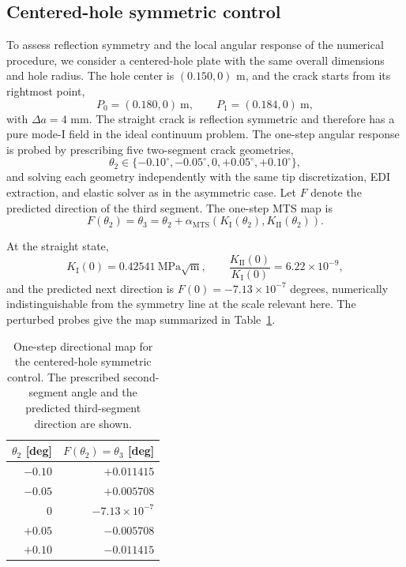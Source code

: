 \documentclass[pdflatex,sn-mathphys-num]{sn-jnl}
\begin{document}
\subsection{Centered-hole symmetric control}
To assess reflection symmetry and the local angular response of the
numerical procedure, we consider a centered-hole plate with the same
overall dimensions and hole radius. The hole center is
$(0.150,0)$ m, and the crack starts from its rightmost point,
\[
 P_0=(0.180,0)\ \mathrm m,
 \qquad
 P_1=(0.184,0)\ \mathrm m,
\]
with $\Delta a=4$ mm. The straight crack is reflection symmetric
and therefore has a pure mode-I field in the ideal continuum problem.
The one-step angular response is probed by prescribing five
two-segment crack geometries,
\[
 \theta_2\in\{-0.10^\circ,-0.05^\circ,0,
                 +0.05^\circ,+0.10^\circ\},
\]
and solving each geometry independently with the same tip
discretization, EDI extraction, and elastic solver as in the
asymmetric case. Let $F$ denote the predicted direction of the
third segment. The one-step MTS map is
\begin{equation}
 F(\theta_2)=\theta_3
 =\theta_2+
 \alpha_{\mathrm{MTS}}\!\left(K_{\mathrm{I}}(\theta_2),K_{\mathrm{II}}(\theta_2)\right).
 \label{eq:symmetric-map}
\end{equation}

At the straight state,
\[
 K_{\mathrm{I}}(0)=0.42541\ \mathrm{MPa}\sqrt{\mathrm m},
 \qquad
 \frac{K_{\mathrm{II}}(0)}{K_{\mathrm{I}}(0)}=6.22\times10^{-9},
\]
and the predicted next direction is
$F(0)=-7.13\times10^{-7}$ degrees, numerically indistinguishable from the
symmetry line at the scale relevant here. The perturbed probes give the
map summarized in Table~\ref{tab:symmetric-stability}.

\begin{table}[htbp]
\centering
\small
\caption{One-step directional map for the centered-hole symmetric control.
The prescribed second-segment angle and the predicted third-segment direction are shown.}
\label{tab:symmetric-stability}
\begin{tabular*}{0.64\linewidth}{@{\extracolsep{\fill}}rr}
\toprule
$\theta_2$ [deg] & $F(\theta_2)=\theta_3$ [deg]\\
\midrule
$-0.10$ & $+0.011415$\\
$-0.05$ & $+0.005708$\\
$0$     & $-7.13\times10^{-7}$\\
$+0.05$ & $-0.005708$\\
$+0.10$ & $-0.011415$\\
\bottomrule
\end{tabular*}
\end{table}
\end{document}
